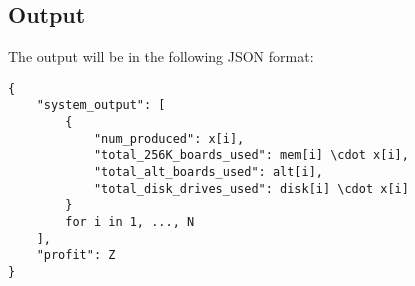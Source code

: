 \documentclass{article}
\begin{document}
\subsection*{Output}
The output will be in the following JSON format:
\begin{verbatim}
{
    "system_output": [
        {
            "num_produced": x[i],
            "total_256K_boards_used": mem[i] \cdot x[i],
            "total_alt_boards_used": alt[i],
            "total_disk_drives_used": disk[i] \cdot x[i]
        }
        for i in 1, ..., N
    ],
    "profit": Z
}
\end{verbatim}
\end{document}
